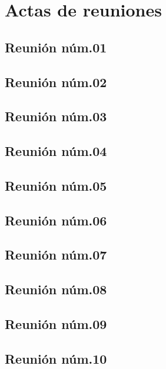 \documentclass[10pt,spanish]{article}
\begin{document}
\section{Actas de reuniones}

\blindtext
\subsection{Reunión núm.01}

\blindtext
\subsection{Reunión núm.02}

\blindtext
\subsection{Reunión núm.03}

\blindtext
\subsection{Reunión núm.04}

\blindtext
\subsection{Reunión núm.05}

\blindtext
\subsection{Reunión núm.06}

\blindtext
\subsection{Reunión núm.07}

\blindtext
\subsection{Reunión núm.08}

\blindtext
\subsection{Reunión núm.09}

\blindtext
\subsection{Reunión núm.10}

\blindtext
\end{document}
